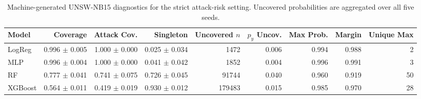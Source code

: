 \begin{table}[t]
\centering
\scriptsize
\setlength{\tabcolsep}{3pt}
\begin{tabular}{@{}lrrrrrrrr@{}}
\toprule
Model & Coverage & Attack Cov. & Singleton & Uncovered $n$ & $p_y$ Uncov. & Max Prob. & Margin & Unique Max \\
\midrule
LogReg & 0.996 $\pm$ 0.005 & 1.000 $\pm$ 0.000 & 0.025 $\pm$ 0.034 & 1472 & 0.006 & 0.994 & 0.988 & 2 \\
MLP & 0.996 $\pm$ 0.004 & 1.000 $\pm$ 0.000 & 0.041 $\pm$ 0.042 & 1852 & 0.004 & 0.996 & 0.991 & 3 \\
RF & 0.777 $\pm$ 0.041 & 0.741 $\pm$ 0.075 & 0.726 $\pm$ 0.045 & 91744 & 0.040 & 0.960 & 0.919 & 50 \\
XGBoost & 0.564 $\pm$ 0.011 & 0.419 $\pm$ 0.019 & 0.930 $\pm$ 0.012 & 179483 & 0.015 & 0.985 & 0.970 & 28 \\
\bottomrule
\end{tabular}
\caption{Machine-generated UNSW-NB15 diagnostics for the strict attack-risk setting. Uncovered probabilities are aggregated over all five seeds.}
\label{tab:unsw-failure-diagnostics}
\end{table}

